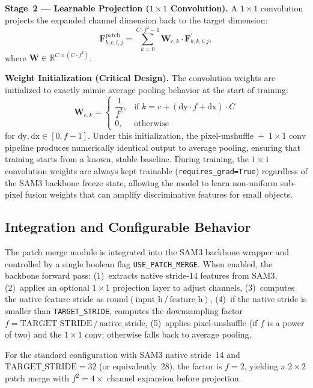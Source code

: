 \textbf{Stage~2 --- Learnable Projection ($1\times1$ Convolution).}
A $1 \times 1$ convolution projects the expanded channel dimension back to the target dimension:
\begin{equation}
\mathbf{F}^{\mathrm{patch}}_{b,c,i,j} = \sum_{k=0}^{C \cdot f^2 - 1} \mathbf{W}_{c,k} \cdot \mathbf{F}^{\prime}_{b,k,i,j},
\end{equation}
where $\mathbf{W} \in \mathbb{R}^{C \times (C \cdot f^2)}$.

\textbf{Weight Initialization (Critical Design).}
The convolution weights are initialized to exactly mimic average pooling behavior at the start of training:
\begin{equation}
\mathbf{W}_{c, k} = \begin{cases} \dfrac{1}{f^2}, & \text{if } k = c + (\mathrm{dy} \cdot f + \mathrm{dx}) \cdot C \\[4pt] 0, & \text{otherwise} \end{cases}
\end{equation}
for $\mathrm{dy}, \mathrm{dx} \in [0, f-1]$. Under this initialization, the pixel-unshuffle~+~$1\times1$ conv pipeline produces numerically identical output to average pooling, ensuring that training starts from a known, stable baseline. During training, the $1\times1$ convolution weights are always kept trainable (\texttt{requires\_grad=True}) regardless of the SAM3 backbone freeze state, allowing the model to learn non-uniform sub-pixel fusion weights that can amplify discriminative features for small objects.

\subsection{Integration and Configurable Behavior}

The patch merge module is integrated into the SAM3 backbone wrapper and controlled by a single boolean flag \texttt{USE\_PATCH\_MERGE}. When enabled, the backbone forward pass: (1)~extracts native stride-14 features from SAM3, (2)~applies an optional $1\times1$ projection layer to adjust channels, (3)~computes the native feature stride as $\mathrm{round}(\mathrm{input\_h} \,/\, \mathrm{feature\_h})$, (4)~if the native stride is smaller than \texttt{TARGET\_STRIDE}, computes the downsampling factor $f = \mathrm{TARGET\_STRIDE} \,/\, \mathrm{native\_stride}$, (5)~applies pixel-unshuffle (if $f$ is a power of two) and the $1\times1$ conv; otherwise falls back to average pooling.

For the standard configuration with SAM3 native stride~14 and $\mathrm{TARGET\_STRIDE} = 32$ (or equivalently~28), the factor is $f = 2$, yielding a $2 \times 2$ patch merge with $f^2 = 4\times$ channel expansion before projection.

